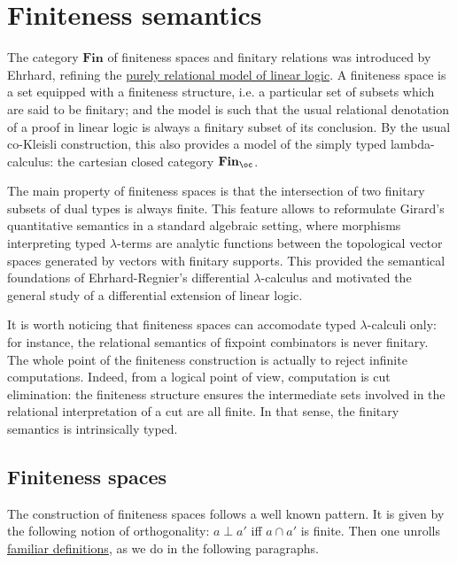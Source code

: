 \chapter{Finiteness semantics}\label{finiteness-semantics}

The category \(\mathbf{Fin}\) of finiteness spaces and finitary
relations was introduced by Ehrhard, refining the
\hyperref[relational-semantics]{purely relational model of linear logic}. A
finiteness space is a set equipped with a finiteness structure, i.e. a
particular set of subsets which are said to be finitary; and the model
is such that the usual relational denotation of a proof in linear logic
is always a finitary subset of its conclusion. By the usual co-Kleisli
construction, this also provides a model of the simply typed
lambda-calculus: the cartesian closed category \(\mathbf{Fin}_\oc\).

The main property of finiteness spaces is that the intersection of two
finitary subsets of dual types is always finite. This feature allows to
reformulate Girard's quantitative semantics in a standard algebraic
setting, where morphisms interpreting typed \(\lambda\)-terms are
analytic functions between the topological vector spaces generated by
vectors with finitary supports. This provided the semantical foundations
of Ehrhard-Regnier's differential \(\lambda\)-calculus and motivated the
general study of a differential extension of linear logic.

It is worth noticing that finiteness spaces can accomodate typed
\(\lambda\)-calculi only: for instance, the relational semantics of
fixpoint combinators is never finitary. The whole point of the
finiteness construction is actually to reject infinite computations.
Indeed, from a logical point of view, computation is cut elimination:
the finiteness structure ensures the intermediate sets involved in the
relational interpretation of a cut are all finite. In that sense, the
finitary semantics is intrinsically typed.

\section{Finiteness spaces}\label{finiteness-spaces}

The construction of finiteness spaces follows a well known pattern. It
is given by the following notion of orthogonality: \(a\mathrel \bot a'\)
iff \(a\cap a'\) is finite. Then one unrolls \hyperref[orthogonality-relation]{familiar definitions}, as we do in the following paragraphs.

